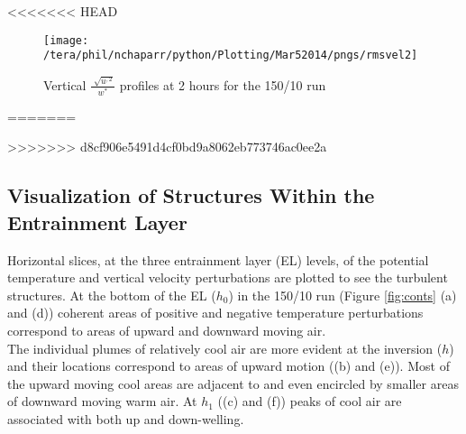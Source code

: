 <<<<<<< HEAD
\begin{figure}[htbp]
    \centering
    \texttt{[image: /tera/phil/nchaparr/python/Plotting/Mar52014/pngs/rmsvel2]}
    \caption{Vertical $\frac{\sqrt[]{u^{,2}}}{w^{*}}$ profiles at 2 hours for the 150/10 run}
    \label{fig:rmsvel150102hrs}   %
\end{figure}
=======

>>>>>>> d8cf906e5491d4cf0bd9a8062eb773746ac0ee2a

\clearpage

\subsection{Visualization of Structures Within the Entrainment Layer}
\FloatBarrier

Horizontal slices, at the three entrainment layer (\acs{EL}) levels, of the potential temperature 
and vertical velocity perturbations are plotted to see the turbulent structures.  At the bottom of the \acs{EL} ($h_{0}$) 
in the 150/10 run (Figure \ref{fig:conts} (a) and (d)) coherent areas of positive and negative temperature perturbations 
correspond to areas of upward and downward moving air.\\

The individual plumes of relatively cool air are more evident at the inversion ($h$) and their 
locations correspond to areas of upward motion ((b) and (e)).  Most of the upward moving cool areas are adjacent to and even 
encircled by smaller areas of downward moving warm air.  At $h_{1}$ ((c) and (f)) peaks of cool air are associated 
with both up and down-welling.\\  

